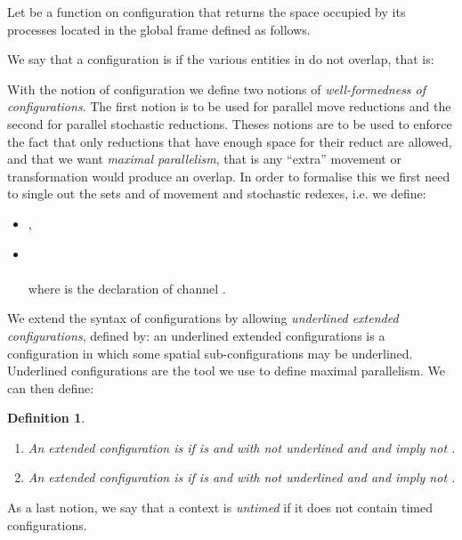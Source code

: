 \documentclass[submission,
copyright,
creativecommons
]{eptcs}
\newtheorem{mydef}{Definition}
\begin{document}
Let  be a function on configuration  that returns the
space occupied by its processes located in the global frame defined as follows.\\
\centerline{}
We say that a configuration  is  if the various entities in  do not overlap, that is:\\
\centerline{
}
With the notion of  configuration we define  two notions of
{\it well-formedness of configurations}.
The first notion is to be used for parallel
move reductions and the second for parallel stochastic reductions.
Theses notions are to be used to enforce  the fact that only
reductions that have enough space for their reduct are allowed, and
 that we want {\em maximal parallelism}, that is any ``extra''
movement or transformation would produce an overlap.  In order to formalise this
we first need to single out the sets  and  of movement and stochastic redexes, i.e. we define:\vspace{-1mm}
\begin{itemize}
\item ,
\item \\
\\

 where  is the declaration of channel .
\end{itemize}\vspace{-1mm}
We extend the syntax of configurations by allowing {\em underlined  extended configurations}, defined by: an underlined  extended configurations is a configuration in which some spatial sub-configurations may be underlined. Underlined configurations
are the tool we use to define maximal parallelism. We can then define:\vspace{-1mm}
\begin{mydef}
\begin{enumerate}
\item An extended configuration  is  if  is  and  with  not underlined and  and   imply  not .\vspace{-1mm}
\item An extended configuration  is  if  is  and  with  not underlined and  and   imply  not .
\end{enumerate}
\end{mydef}\vspace{-1mm}
As a last notion, we say that a context  is {\em untimed} if it does not contain timed configurations.
\end{document}
